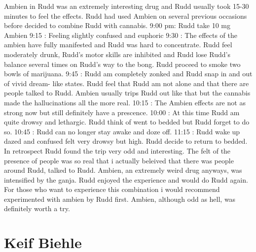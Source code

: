 \documentclass[12pt]{book}
\begin{document}
Ambien in Rudd was an extremely interesting drug and Rudd usually took 15-30 minutes to feel the effects. Rudd had used Ambien on several previous occasions before decided to combine Rudd with cannabis. 9:00 pm: Rudd take 10 mg Ambien 9:15 : Feeling slightly confused and euphoric 9:30 : The effects of the ambien have fully manifested and Rudd was hard to concentrate. Rudd feel moderately drunk, Rudd's motor skills are inhibited and Rudd lose Rudd's balance several times on Rudd's way to the bong. Rudd proceed to smoke two bowls of marijuana. 9:45 : Rudd am completely zonked and Rudd snap in and out of vivid dream- like states. Rudd feel that Rudd am not alone and that there are people talked to Rudd. Ambien usually trips Rudd out like that but the cannabis made the hallucinations all the more real. 10:15 : The Ambien effects are not as strong now but still definitely have a prescence. 10:00 : At this time Rudd am quite drowsy and lethargic. Rudd think of went to bedded but Rudd forget to do so. 10:45 : Rudd can no longer stay awake and doze off. 11:15 : Rudd wake up dazed and confused felt very drowsy but high. Rudd decide to return to bedded. In retrospect Rudd found the trip very odd and interesting. The felt of the presence of people was so real that i actually beleived that there was people around Rudd, talked to Rudd. Ambien, an extremely weird drug anyways, was intensified by the ganja. Rudd enjoyed the experience and would do Rudd again. For those who want to experience this combination i would recommend experimented with ambien by Rudd first. Ambien, although odd as hell, was definitely worth a try.



\chapter{Keif Biehle}
\end{document}
